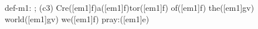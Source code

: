 def-m1: \grealign;
(c3) Cre([em1]f)a([em1]f)tor([em1]f) of([em1]f) the([em1]gv) world([em1]gv) we([em1]f) pray:([em1]e)
